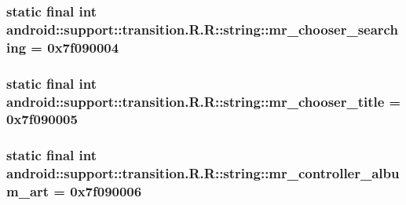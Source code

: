 \hypertarget{classandroid_1_1support_1_1transition_1_1_r_1_1string_26b0b3659d623ce840b2e198f014a94c}{
\subsubsection[{mr\_\-chooser\_\-searching}]{\setlength{\rightskip}{0pt plus 5cm}static final int android::support::transition.R.R::string::mr\_\-chooser\_\-searching = 0x7f090004}}
\label{classandroid_1_1support_1_1transition_1_1_r_1_1string_26b0b3659d623ce840b2e198f014a94c}


\hypertarget{classandroid_1_1support_1_1transition_1_1_r_1_1string_e4965840f22827b31d700d4c6387bd33}{
\subsubsection[{mr\_\-chooser\_\-title}]{\setlength{\rightskip}{0pt plus 5cm}static final int android::support::transition.R.R::string::mr\_\-chooser\_\-title = 0x7f090005}}
\label{classandroid_1_1support_1_1transition_1_1_r_1_1string_e4965840f22827b31d700d4c6387bd33}


\hypertarget{classandroid_1_1support_1_1transition_1_1_r_1_1string_eec8c0a3a8b9136330359d7a6cce0039}{
\subsubsection[{mr\_\-controller\_\-album\_\-art}]{\setlength{\rightskip}{0pt plus 5cm}static final int android::support::transition.R.R::string::mr\_\-controller\_\-album\_\-art = 0x7f090006}}
\label{classandroid_1_1support_1_1transition_1_1_r_1_1string_eec8c0a3a8b9136330359d7a6cce0039}


